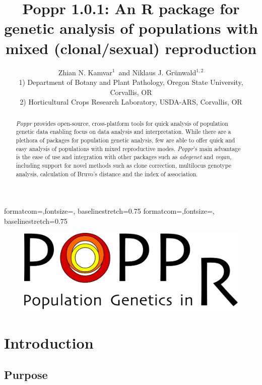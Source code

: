 \documentclass[letterpaper]{article}
\title{Poppr 1.0.1: An R package for genetic analysis of populations with mixed (clonal/sexual) reproduction}
\author{Zhian N. Kamvar$^{1}$\ and Niklaus J. Gr\"unwald$^{1,2}$\\\scriptsize{1) Department of Botany and Plant Pathology, Oregon State University, Corvallis, OR}\\\scriptsize{2) Horticultural Crops Research Laboratory, USDA-ARS, Corvallis, OR}}
\begin{document}

{formatcom={\color{Sinput}},fontsize=\footnotesize, baselinestretch=0.75}
{formatcom={\color{Soutput}},fontsize=\footnotesize, baselinestretch=0.75}
\maketitle
\begin{abstract}
\textit{Poppr} provides open-source, cross-platform tools for quick analysis of population genetic data enabling focus on data analysis and interpretation. While there are a plethora of packages for population genetic analysis, few are able to offer quick and easy analysis of populations with mixed reproductive modes. \textit{Poppr}'s main advantage is the ease of use and integration with other packages such as \textit{adegenet} and \textit{vegan}, including support for novel methods such as clone correction, multilocus genotype analysis, calculation of Bruvo's distance and the index of association. 
\end{abstract}
\begin{figure}[b]
  \centering
  \label{logo}
  \includegraphics{popprlogo}
\end{figure}
\newpage
\begingroup
\hypersetup{linkcolor=black}
\tableofcontents
\endgroup

\section{Introduction}\label{intro}
\subsection{Purpose}\label{intro:purpose}
\end{document}
